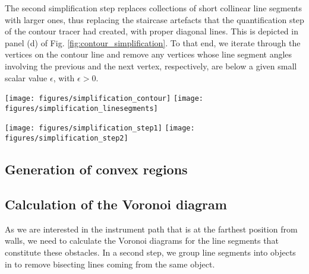 The second simplification step replaces collections of short collinear line segments with larger ones,
thus replacing the staircase artefacts that the quantification step of the contour tracer had created,
with proper diagonal lines. This is depicted in panel (d) of Fig. \ref{fig:contour_simplification}.
To that end, we iterate through the vertices on the contour line and remove any vertices whose line segment angles
involving the previous and the next vertex, respectively, are below a given small scalar value $\epsilon$, with $\epsilon > 0$.


\begin{figure*}
	\texttt{[image: figures/simplification\_contour]}
	\hspace{0.1cm}
	\texttt{[image: figures/simplification\_linesegments]}

	\vspace{0.25cm}

	\texttt{[image: figures/simplification\_step1]}
	\hspace{0.1cm}
	\texttt{[image: figures/simplification\_step2]}
	\caption{Typical example of a contour line segment generation and simplification.
		Panel (a): A contour line (green) separating two regions (blue and red) that has been found using the tracing algorithm (section \ref{sec:contourtracing}).
		Panel (b): Vertices (while circles) are generated for each pixel and connected by line segments (black lines).
		Panel (c): Staircase artefacts are removed from the line segment collection.
		Panel (d): Collinear line segments are merged and unnecessary vertices removed.
		\label{fig:contour_simplification}}
\end{figure*}


\subsection{Generation of convex regions}
\label{sec:convex_regions}




\subsection{Calculation of the Voronoi diagram}
As we are interested in the instrument path that is at the farthest position from walls, we need to calculate
the Voronoi diagrams for the line segments that constitute these obstacles. In a second step, we group line
segments into objects in to remove bisecting lines coming from the same object.


